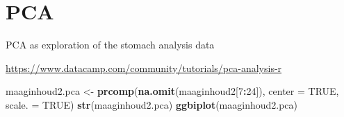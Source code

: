 \documentclass[]{article}
\newenvironment{Shaded}{\begin{snugshade}}{\end{snugshade}}
\newcommand{\KeywordTok}[1]{\textcolor[rgb]{0.13,0.29,0.53}{\textbf{#1}}}
\newcommand{\DataTypeTok}[1]{\textcolor[rgb]{0.13,0.29,0.53}{#1}}
\newcommand{\DecValTok}[1]{\textcolor[rgb]{0.00,0.00,0.81}{#1}}
\newcommand{\StringTok}[1]{\textcolor[rgb]{0.31,0.60,0.02}{#1}}
\newcommand{\OtherTok}[1]{\textcolor[rgb]{0.56,0.35,0.01}{#1}}
\newcommand{\OperatorTok}[1]{\textcolor[rgb]{0.81,0.36,0.00}{\textbf{#1}}}
\newcommand{\NormalTok}[1]{#1}
\begin{document}
\section{PCA}\label{pca}

PCA as exploration of the stomach analysis data

\url{https://www.datacamp.com/community/tutorials/pca-analysis-r}

\begin{Shaded}
\begin{Highlighting}[]
\NormalTok{maaginhoud2.pca <-}\StringTok{ }\KeywordTok{prcomp}\NormalTok{(}\KeywordTok{na.omit}\NormalTok{(maaginhoud2[}\DecValTok{7}\OperatorTok{:}\DecValTok{24}\NormalTok{]), }\DataTypeTok{center =} \OtherTok{TRUE}\NormalTok{, }\DataTypeTok{scale. =} \OtherTok{TRUE}\NormalTok{)}
\KeywordTok{str}\NormalTok{(maaginhoud2.pca)}
\KeywordTok{ggbiplot}\NormalTok{(maaginhoud2.pca)}
\end{Highlighting}
\end{Shaded}
\end{document}
